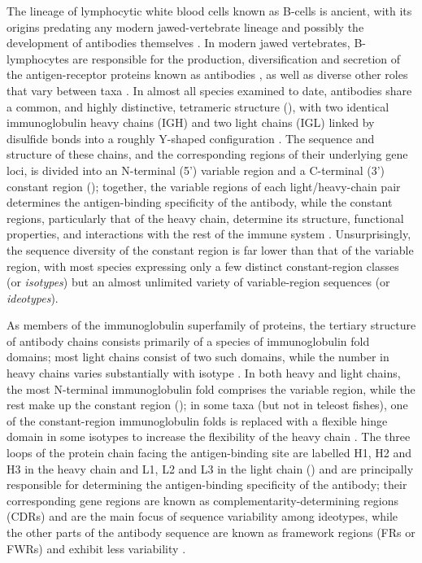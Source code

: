 The lineage of lymphocytic white blood cells known as B-cells is ancient, with its origins predating any modern jawed-vertebrate lineage and possibly the development of antibodies themselves \parencite{boehm2011design,kasahara2015vlr}. In modern jawed vertebrates, B-lymphocytes are responsible for the production, diversification and secretion of the antigen-receptor proteins known as antibodies \parencite{mix2006immunoglobulins,schroeder2010immunoglobulins}, as well as diverse other roles that vary between taxa \parencite{sunyer2013fishing}. In almost all species examined to date, antibodies share a common, and highly distinctive, tetrameric structure (), with two identical immunoglobulin heavy chains (IGH) and two light chains (IGL) linked by disulfide bonds into a roughly Y-shaped configuration \parencite{mix2006immunoglobulins,schroeder2010immunoglobulins}. The sequence and structure of these chains, and the corresponding regions of their underlying gene loci, is divided into an N-terminal (5') variable region and a C-terminal (3') constant region \parencite{mix2006immunoglobulins} (); together, the variable regions of each light/heavy-chain pair determines the antigen-binding specificity of the antibody, while the constant regions, particularly that of the heavy chain, determine its structure, functional properties, and interactions with the rest of the immune system \parencite{mix2006immunoglobulins,schroeder2010immunoglobulins}. Unsurprisingly, the sequence diversity of the constant region is far lower than that of the variable region, with most species expressing only a few distinct constant-region classes (or \textit{isotypes}) but an almost unlimited variety of variable-region sequences (or \textit{ideotypes}).

As members of the immunoglobulin superfamily of proteins, the tertiary structure of antibody chains consists primarily of a species of immunoglobulin fold domains; most light chains consist of two such domains, while the number in heavy chains varies substantially with isotype \parencite{schroeder2010immunoglobulins}. In both heavy and light chains, the most N-terminal immunoglobulin fold comprises the variable region, while the rest make up the constant region (); in some taxa (but not in teleost fishes), one of the constant-region immunoglobulin folds is replaced with a flexible hinge domain in some isotypes to increase the flexibility of the heavy chain \parencite{schroeder2010immunoglobulins}. The three loops of the protein chain facing the antigen-binding site are labelled H1, H2 and H3 in the heavy chain and L1, L2 and L3 in the light chain () \parencite{shirai1999h3} and are principally responsible for determining the antigen-binding specificity of the antibody; their corresponding gene regions are known as complementarity-determining regions (CDRs) and are the main focus of sequence variability among ideotypes, while the other parts of the antibody sequence are known as framework regions (FRs or FWRs) and exhibit less variability \parencite{schroeder2010immunoglobulins}.

